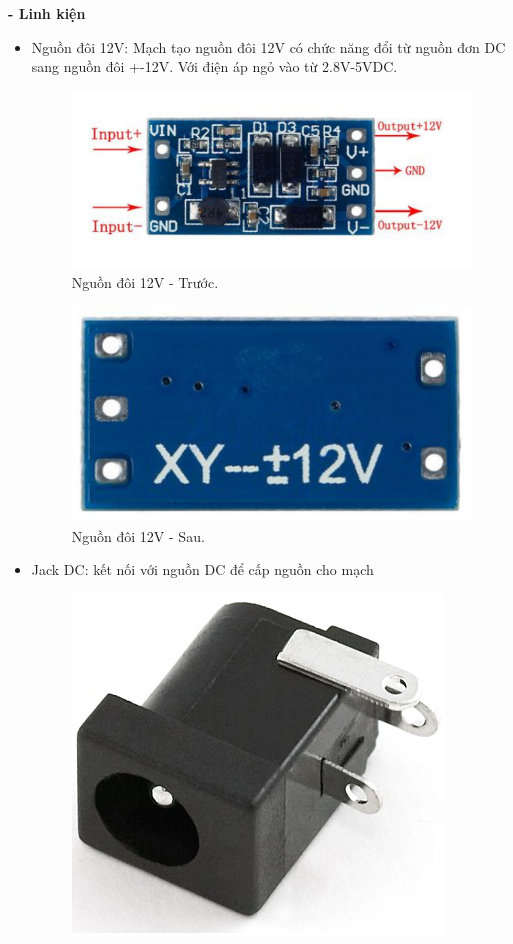 \documentclass[a4paper,12pt,oneside]{article}
\begin{document}
\textbf{- Linh kiện}
\begin{itemize}
\item	Nguồn đôi 12V: Mạch tạo nguồn đôi 12V có chức năng đổi từ nguồn đơn DC sang nguồn đôi +-12V. Với điện áp ngỏ vào từ 2.8V-5VDC.
\begin{figure}[H]
\centering
\begin{center}
\includegraphics[scale=.7]{hinh/PPM/ppm_12vtruoc.png}
\end{center}
\caption{Nguồn đôi 12V - Trước.}
\end{figure}
\begin{figure}[H]
\centering
\begin{center}
\includegraphics[scale=.4]{hinh/PPM/ppm_12vsau.png}
\end{center}
\caption{Nguồn đôi 12V - Sau.}
\end{figure}
\item	Jack DC: kết nối với nguồn DC để cấp nguồn cho mạch
\begin{figure}[H]
\centering
\begin{center}
\includegraphics[scale=.3]{hinh/PPM/ppm_jackdc.jpg}

\end{center}
\end{figure}
\end{itemize}
\end{document}
